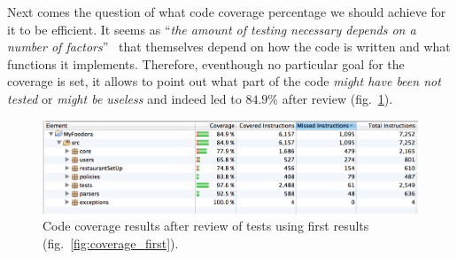 Next comes the question of what code coverage percentage
we should achieve for it to be efficient.
It seems as ``\textit{the amount of testing necessary depends on a number of
factors}''~\cite{artimaHowMuchCoverage} that themselves depend
on how the code is written and what functions it implements.
Therefore, eventhough no particular goal for the coverage is set,
it allows to point out what part of the code \emph{might have been not tested}
or \emph{might be useless} and indeed led to $84.9\%$ after review (fig.~\ref{fig:coverage_end}).

\begin{figure}[h]
  \begin{center}
    \includegraphics[scale=0.47]{./img/coverage_end.png} 
  \end{center}
  \caption{Code coverage results after review of
  tests using first results (fig.~\ref{fig:coverage_first}).}
  \label{fig:coverage_end}
\end{figure}

